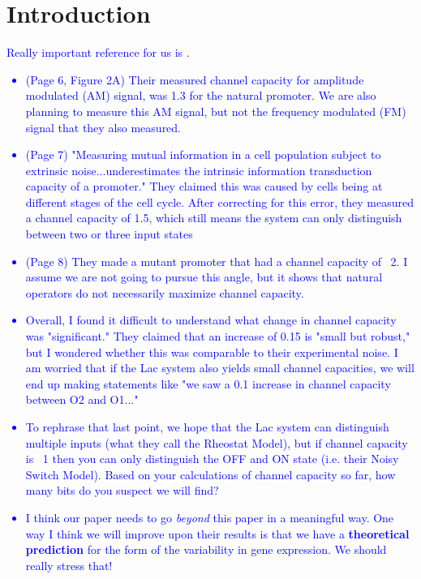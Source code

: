 \section{Introduction}

\textcolor{blue}{Really important reference for us is \cite{Hansen2015}.
	\begin{itemize}
		\item (Page 6, Figure 2A) Their measured channel capacity for amplitude modulated (AM) signal, was 1.3 for the natural promoter. We are also planning to measure this AM signal, but not the frequency modulated (FM) signal that they also measured.
		\item (Page 7) "Measuring mutual information in a cell population subject to extrinsic noise...underestimates the intrinsic information transduction capacity of a promoter." They claimed this was caused by cells being at different stages of the cell cycle. After correcting for this error, they measured a channel capacity of 1.5, which still means the system can only distinguish between two or three input states
		\item (Page 8) They made a mutant promoter that had a channel capacity of ~2. I assume we are not going to pursue this angle, but it shows that natural operators do not necessarily maximize channel capacity.
		\item Overall, I found it difficult to understand what change in channel capacity was "significant." They claimed that an increase of 0.15 is "small but robust," but I wondered whether this was comparable to their experimental noise. I am worried that if the Lac system also yields small channel capacities, we will end up making statements like "we saw a 0.1 increase in channel capacity between O2 and O1..."
		\item To rephrase that last point, we hope that the Lac system can distinguish multiple inputs (what they call the Rheostat Model), but if channel capacity is ~1 then you can only distinguish the OFF and ON state (i.e. their Noisy Switch Model). Based on your calculations of channel capacity so far, how many bits do you suspect we will find?
		\item I think our paper needs to go \textit{beyond} this paper in a meaningful way. One way I think we will improve upon their results is that we have a \textbf{theoretical prediction} for the form of the variability in gene expression. We should really stress that!
	\end{itemize}
	}
	
